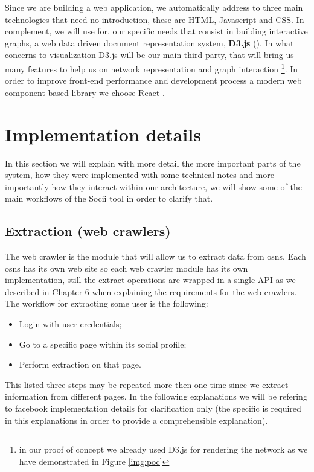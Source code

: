 Since we are building a web application, we automatically address to three main technologies that need no introduction, these are HTML, Javascript and CSS. In complement, we will use for, our specific needs that consist in building interactive graphs, a web data driven document representation system, \textbf{D3.js} (\cite{bostock2012d3}). In what concerns to visualization D3.js will be our main third party, that will bring us many features to help us on network representation and graph interaction \footnote{in our proof of concept we already used D3.js for rendering the network as we have demonstrated in Figure \ref{img:poc}}. In order to improve front-end performance and development process a modern web component based library we choose React \cite{react}.

\section{Implementation details}

In this section we will explain with more detail the more important parts of the system, how they were implemented with some technical notes and more importantly how they interact within our architecture, we will show some of the main workflows of the Socii tool in order to clarify that.

\subsection{Extraction (web crawlers)}
The web crawler is the module that will allow us to extract data from \glspl{osn}. Each \glspl{osn} has its own web site so each web crawler module has its own implementation, still the extract operations are wrapped in a single API as we described in Chapter 6 when explaining the requirements for the web crawlers. The workflow for extracting some user is the following:
\begin{itemize}
    \item Login with user credentials;
    \item Go to a specific page within its social profile;
    \item Perform extraction on that page.
\end{itemize}
This listed three steps may be repeated more then one time since we extract information from different pages. In the following explanations we will be refering to facebook implementation details for clarification only (the specific is required in this explanations in order to provide a comprehensible explanation).

